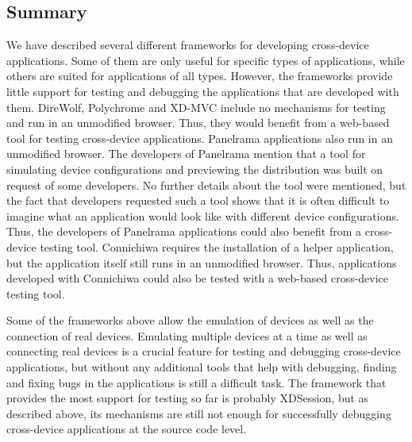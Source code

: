 \subsection{Summary}

We have described several different frameworks for developing cross-device applications. Some of them are only useful for specific types of applications, while others are suited for applications of all types. However, the frameworks provide little support for testing and debugging the applications that are developed with them. DireWolf, Polychrome and XD-MVC include no mechanisms for testing and run in an unmodified browser. Thus, they would benefit from a web-based tool for testing cross-device applications. Panelrama applications also run in an unmodified browser. The developers of Panelrama mention that a tool for simulating device configurations and previewing the distribution was built on request of some developers. No further details about the tool were mentioned, but the fact that developers requested such a tool shows that it is often difficult to imagine what an application would look like with different device configurations. Thus, the developers of Panelrama applications could also benefit from a cross-device testing tool. Connichiwa requires the installation of a helper application, but the application itself still runs in an unmodified browser. Thus, applications developed with Connichiwa could also be tested with a web-based cross-device testing tool.

Some of the frameworks above allow the emulation of devices as well as the connection of real devices. Emulating multiple devices at a time as well as connecting real devices is a crucial feature for testing and debugging cross-device applications, but without any additional tools that help with debugging, finding and fixing bugs in the applications is still a difficult task. The framework that provides the most support for testing so far is probably XDSession, but as described above, its mechanisms are still not enough for successfully debugging cross-device applications at the source code level.